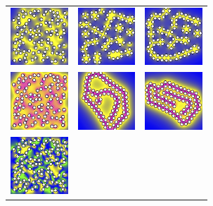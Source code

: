 \begin{figure}
  \vspace{-10pt}
  \begin{center}
    \begin{tabular}{m{0.9in}m{0.9in}m{0.9in}}                 
    \includegraphics[width=0.85in]{figures/SpecificAim1/N100B1.jpg}
    &\includegraphics[width=0.85in]{figures/SpecificAim1/N100B2.jpg}
     &\includegraphics[width=0.85in]{figures/SpecificAim1/N100B3.jpg}    \\
    \includegraphics[width=0.85in]{figures/SpecificAim1/N100C1.jpg}
    &\includegraphics[width=0.85in]{figures/SpecificAim1/N100C2.jpg}
      &\includegraphics[width=0.85in]{figures/SpecificAim1/N100C3.jpg}    \\
      \includegraphics[width=0.85in]{figures/SpecificAim1/N100A1.jpg}

\end{tabular}
\end{center}
\end{figure}
